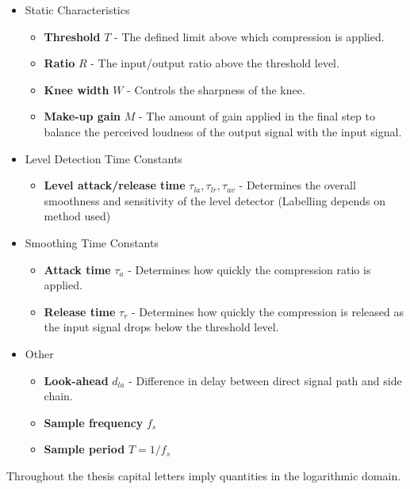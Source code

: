 \documentclass[../main2.tex]{subfiles}
\begin{document}
\begin{itemize}
\item{Static Characteristics}
	\begin{itemize}
	\item \textbf{Threshold} $T$ - The defined limit above which compression is applied.
	\item \textbf{Ratio} $R$ - The input/output ratio above the threshold level.
	\item \textbf{Knee width}  $W$ - Controls the sharpness of the knee.
	\item \textbf{Make-up gain}  $M$ - The amount of gain applied in the final step to balance the perceived loudness of the output signal with the input signal.
\end{itemize}
\item{Level Detection Time Constants}
	\begin{itemize}
	\item \textbf{Level attack/release time} $\tau_{la}, \tau_{lr}, \tau_{av}$ - Determines the overall smoothness and sensitivity of the level detector (Labelling depends on method used)
	\end{itemize}
\item{Smoothing Time Constants}
	\begin{itemize}
	\item \textbf{Attack time} $\tau_{a}$ - Determines how quickly the compression ratio is applied.
	\item \textbf{Release time} $\tau_{r}$ - Determines how quickly the compression is released as the input signal drops below the threshold level.
	\end{itemize}
\item{Other}
	\begin{itemize}
	\item \textbf{Look-ahead} $d_{la}$ - Difference in delay between direct signal path and side chain. 
	\item \textbf{Sample frequency} $f_s$
	\item \textbf{Sample period} $T = 1/f_s$
	\end{itemize}
\end{itemize}
Throughout the thesis capital letters imply quantities in the logarithmic domain. 
\end{document}
